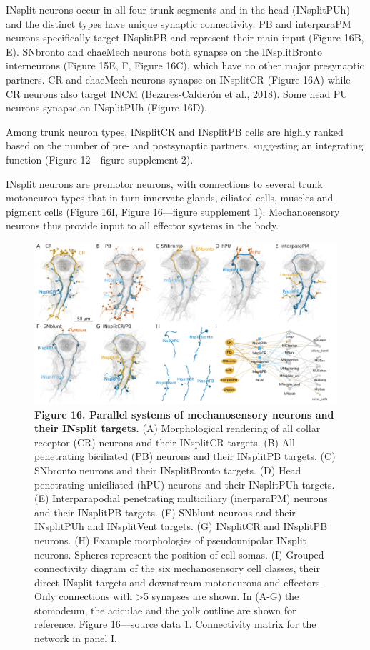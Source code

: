 \documentclass[
  11pt,
]{article}
\begin{document}
INsplit neurons occur in all four trunk segments and in the head
(INsplitPUh) and the distinct types have unique synaptic connectivity.
PB and interparaPM neurons specifically target INsplitPB and represent
their main input (Figure 16B, E). SNbronto and chaeMech neurons both
synapse on the INsplitBronto interneurons (Figure 15E, F, Figure 16C),
which have no other major presynaptic partners. CR and chaeMech neurons
synapse on INsplitCR (Figure 16A) while CR neurons also target INCM
(Bezares-Calderón et al., 2018). Some head PU neurons synapse on
INsplitPUh (Figure 16D).

Among trunk neuron types, INsplitCR and INsplitPB cells are highly
ranked based on the number of pre- and postsynaptic partners, suggesting
an integrating function (Figure 12---figure supplement 2).

INsplit neurons are premotor neurons, with connections to several trunk
motoneuron types that in turn innervate glands, ciliated cells, muscles
and pigment cells (Figure 16I, Figure 16---figure supplement 1).
Mechanosensory neurons thus provide input to all effector systems in the
body.

\begin{figure}[H]

{\centering \includegraphics[width=1\textwidth,height=\textheight]{Figures/Figure16.png}

}

\caption{\textbf{Figure 16. Parallel systems of mechanosensory neurons
and their INsplit targets. } (A) Morphological rendering of all collar
receptor (CR) neurons and their INsplitCR targets. (B) All penetrating
biciliated (PB) neurons and their INsplitPB targets. (C) SNbronto
neurons and their INsplitBronto targets. (D) Head penetrating
uniciliated (hPU) neurons and their INsplitPUh targets. (E)
Interparapodial penetrating multiciliary (inerparaPM) neurons and their
INsplitPB targets. (F) SNblunt neurons and their INsplitPUh and
INsplitVent targets. (G) INsplitCR and INsplitPB neurons. (H) Example
morphologies of pseudounipolar INsplit neurons. Spheres represent the
position of cell somas. (I) Grouped connectivity diagram of the six
mechanosensory cell classes, their direct INsplit targets and downstream
motoneurons and effectors. Only connections with \textgreater5 synapses
are shown. In (A-G) the stomodeum, the aciculae and the yolk outline are
shown for reference. Figure 16---source data 1. Connectivity matrix for
the network in panel I.}

\end{figure}%
\end{document}
